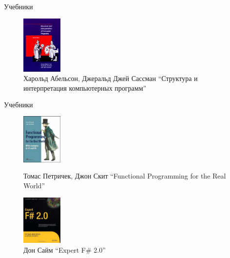 \documentclass{beamer}
\begin{document}
\begin{frame}{Учебники}
  \begin{figure}[h]
    \begin{minipage}[h]{0.49\linewidth}
      \begin{center}
          \includegraphics[width=20mm]{lecture0/SICP.eps}
          \caption{Харольд Абельсон, Джеральд Джей Сассман
            ``Структура и интерпретация компьютерных программ''}
      \end{center}
    \end{minipage}
  \end{figure}
\end{frame}

\begin{frame}{Учебники}
  \begin{figure}[h]
    \begin{minipage}[h]{0.49\linewidth}
      \begin{center}
          \includegraphics[width=20mm]{lecture0/FPiRW.eps}
          \caption{Томас Петричек, Джон Скит
            ``Functional Programming for the Real World''}
      \end{center}
    \end{minipage}
    \begin{minipage}[h]{0.49\linewidth}
      \begin{center}
        \includegraphics[width=20mm]{lecture0/Expert_Fsharp.eps}
        \caption{Дон Сайм ``Expert F\# 2.0''}
      \end{center}
    \end{minipage}
  \end{figure}
\end{frame}
\end{document}
